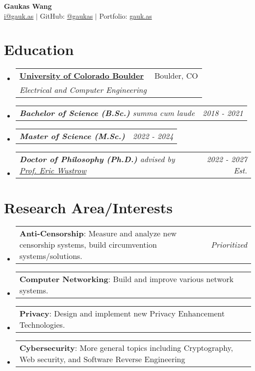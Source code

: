\documentclass[letterpaper,11pt]{article}
\makeatletter
\newcommand{\resumeSubheading}[4]{
  \vspace{-2pt}\item
    \begin{tabular*}{0.97\textwidth}[t]{l@{\extracolsep{\fill}}r}
      \textbf{#1} & #2 \\
      \textit{\small#3} & \textit{\small #4} \\
    \end{tabular*}\vspace{-7pt}
}
\newcommand{\resumeSubSubheading}[2]{
    \item
    \begin{tabular*}{0.97\textwidth}{l@{\extracolsep{\fill}}r}
      \textit{\small#1} & \textit{\small #2} \\
    \end{tabular*}\vspace{-7pt}
}
\newcommand{\resumeProjectHeading}[2]{
    \item
    \begin{tabular*}{0.97\textwidth}{l@{\extracolsep{\fill}}r}
      \small#1 & #2 \\
    \end{tabular*}\vspace{-7pt}
}
\newcommand{\resumeSubHeadingListStart}{\begin{itemize}[leftmargin=0.15in, label={}]}
\newcommand{\resumeSubHeadingListEnd}{\end{itemize}}
\makeatother
\begin{document}
\begin{center}
  {\textbf{\Huge Gaukas Wang}} \\ \vspace{4pt}
    \href{mailto:i@gauk.as}{{i@gauk.as}} $|$ 
    GitHub: \href{https://github.com/gaukas}{@gaukas} $|$ 
    Portfolio: \href{https://gauk.as}{gauk.as}
\end{center}


\section{Education}
\resumeSubHeadingListStart
\resumeSubheading
{\href{https://colorado.edu}{University of Colorado Boulder}}{Boulder, CO}
{Electrical and Computer Engineering}{}
\resumeSubSubheading
{
  \em{\textbf{Bachelor of Science (B.Sc.)}} \textit{summa cum laude}
}{2018 - 2021}
\resumeSubSubheading
{
  \em{}\textbf{Master of Science (M.Sc.)} %
}{2022 - 2024}
\resumeSubSubheading
{
  \em{}\textbf{Doctor of Philosophy (Ph.D.)} 
  {advised by \href{https://ericw.us/trow}{Prof. Eric Wustrow}}
}{2022 - 2027 Est.}
\resumeSubHeadingListEnd

\vspace{1pt}

\section{Research Area/Interests}
\resumeSubHeadingListStart
  \resumeProjectHeading {\textbf{Anti-Censorship}: Measure and analyze new censorship systems, build circumvention systems/solutions.}{\textit{Prioritized}}
  \resumeProjectHeading {\textbf{Computer Networking}: Build and improve various network systems.}{}
  \resumeProjectHeading {\textbf{Privacy}: Design and implement new Privacy Enhancement Technologies.}{}
  \resumeProjectHeading {\textbf{Cybersecurity}: More general topics including Cryptography, Web security, and Software Reverse Engineering}{}
\resumeSubHeadingListEnd
\vspace{1pt}

\end{document}
